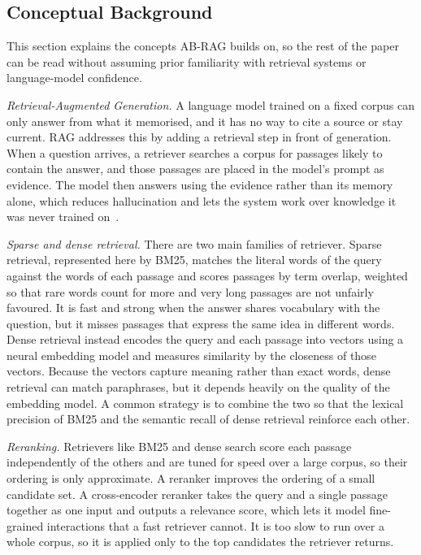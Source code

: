 \documentclass[conference,a4paper,10pt]{IEEEtran}
\begin{document}
\subsection{Conceptual Background}
This section explains the concepts AB-RAG builds on, so the rest of the paper can be
read without assuming prior familiarity with retrieval systems or language-model
confidence.

\textit{Retrieval-Augmented Generation.}
A language model trained on a fixed corpus can only answer from what it memorised, and
it has no way to cite a source or stay current. RAG addresses this by adding a retrieval
step in front of generation. When a question arrives, a retriever searches a corpus for
passages likely to contain the answer, and those passages are placed in the model's
prompt as evidence. The model then answers using the evidence rather than its memory
alone, which reduces hallucination and lets the system work over knowledge it was never
trained on~\cite{shuster2021retrieval, gao2023survey}.

\textit{Sparse and dense retrieval.}
There are two main families of retriever. Sparse retrieval, represented here by BM25,
matches the literal words of the query against the words of each passage and scores
passages by term overlap, weighted so that rare words count for more and very long
passages are not unfairly favoured. It is fast and strong when the answer shares
vocabulary with the question, but it misses passages that express the same idea in
different words. Dense retrieval instead encodes the query and each passage into vectors
using a neural embedding model and measures similarity by the closeness of those
vectors. Because the vectors capture meaning rather than exact words, dense retrieval
can match paraphrases, but it depends heavily on the quality of the embedding model. A
common strategy is to combine the two so that the lexical precision of BM25 and the
semantic recall of dense retrieval reinforce each other.

\textit{Reranking.}
Retrievers like BM25 and dense search score each passage independently of the others and
are tuned for speed over a large corpus, so their ordering is only approximate. A
reranker improves the ordering of a small candidate set. A cross-encoder reranker takes
the query and a single passage together as one input and outputs a relevance score,
which lets it model fine-grained interactions that a fast retriever cannot. It is too
slow to run over a whole corpus, so it is applied only to the top candidates the
retriever returns.
\end{document}
